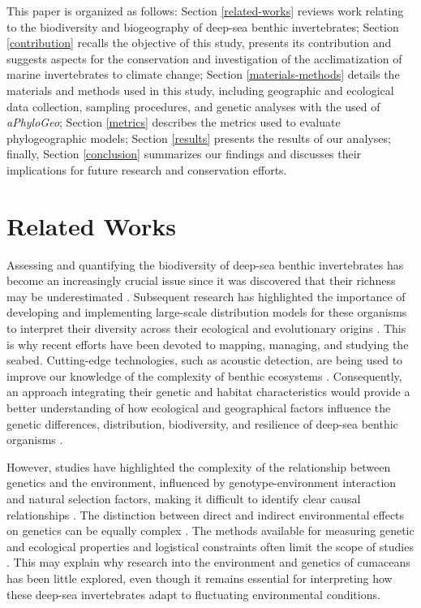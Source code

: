 This paper is organized as follows: Section \autoref{related-works} reviews work relating to the biodiversity and biogeography of deep-sea benthic invertebrates; Section \autoref{contribution} recalls the objective of this study, presents its contribution and suggests aspects for the conservation and investigation of the acclimatization of marine invertebrates to climate change; Section \autoref{materials-methods} details the materials and methods used in this study, including geographic and ecological data collection, sampling procedures, and genetic analyses with the used of \textit{aPhyloGeo}; Section \autoref{metrics} describes the metrics used to evaluate phylogeographic models; Section \autoref{results} presents the results of our analyses; finally, Section \autoref{conclusion} summarizes our findings and discusses their implications for future research and conservation efforts.

\section{Related Works}\label{related-works}
Assessing and quantifying the biodiversity of deep-sea benthic invertebrates has become an increasingly crucial issue since it was discovered that their richness may be underestimated \citep{grassle1992deep}. Subsequent research has highlighted the importance of developing and implementing large-scale distribution models for these organisms to interpret their diversity across their ecological and evolutionary origins \citep{rex1997large}. This is why recent efforts have been devoted to mapping, managing, and studying the seabed. Cutting-edge technologies, such as acoustic detection, are being used to improve our knowledge of the complexity of benthic ecosystems \citep{brown2011benthic}. Consequently, an approach integrating their genetic and habitat characteristics would provide a better understanding of how ecological and geographical factors influence the genetic differences, distribution, biodiversity, and resilience of deep-sea benthic organisms \citep{etter1990population, vrijenhoek2009cryptic}.

However, studies have highlighted the complexity of the relationship between genetics and the environment, influenced by genotype-environment interaction and natural selection factors, making it difficult to identify clear causal relationships \citep{balkenhol_identifying_2009}. The distinction between direct and indirect environmental effects on genetics can be equally complex \citep{manel_perspectives_2010, balkenhol_landscape_2019}. The methods available for measuring genetic and ecological properties and logistical constraints often limit the scope of studies \citep{manel_perspectives_2010, shafer_widespread_2013}. This may explain why research into the environment and genetics of cumaceans has been little explored, even though it remains essential for interpreting how these deep-sea invertebrates adapt to fluctuating environmental conditions.

